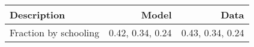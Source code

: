 \begin{tabular}{lrr}
\hline
Description & Model  & Data  \\ 
\hline
Fraction by schooling & 0.42, 0.34, 0.24  & 0.43, 0.34, 0.24  \\ 
\hline
\end{tabular}%
